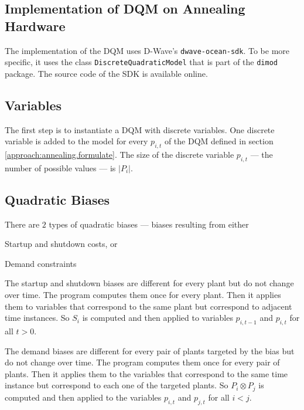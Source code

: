 \subsection{Implementation of DQM on Annealing Hardware}
\label{approach:annealing.implement.dqm}

The implementation of the DQM uses D-Wave's \texttt{dwave-ocean-sdk}.
\cite{OceanSDKDoc}
To be more specific, it uses the class \texttt{DiscreteQuadraticModel} that is part of the \texttt{dimod} package.
\cite{DQMDoc}
The source code of the SDK is available online.
\cite{OceanSDKGit}

\subsection*{Variables}

The first step is to instantiate a DQM with discrete variables.
One discrete variable is added to the model for every $p_{i, t}$ of the DQM defined in section \ref{approach:annealing.formulate}.
The size of the discrete variable $p_{i, t}$ --- the number of possible values --- is $| P_i |$.

\subsection*{Quadratic Biases}
\label{approach:annealing.implement.dqm.quadratic}

There are $2$ types of quadratic biases
--- biases resulting from either
\begin{enumerate*}[label=(\roman*)]
  \item Startup and shutdown costs, or
  \item Demand constraints
\end{enumerate*}

The startup and shutdown biases are different for every plant but do not change over time.
The program computes them once for every plant.
Then it applies them to variables that correspond to the same plant but correspond to adjacent time instances.
So $S_i$ is computed and then applied to variables $p_{i, t-1}$ and $p_{i, t}$ for all $t > 0$.

The demand biases are different for every pair of plants targeted by the bias but do not change over time.
The program computes them once for every pair of plants.
Then it applies them to the variables that correspond to the same time instance but correspond to each one of the targeted plants.
So $P_i \otimes P_j$ is computed and then applied to the variables $p_{i, t}$ and $p_{j, t}$ for all $i < j$.

